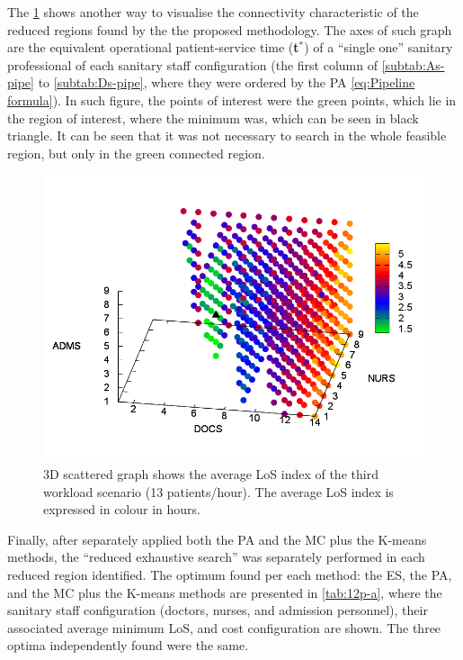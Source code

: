 The \ref{fig:3D-scattered-graph-75} shows another way to visualise
the connectivity characteristic of the reduced regions found by the
the proposed methodology. The axes of such graph are the equivalent
operational patient-service time ({\bf t$^*$})
of a ``single one'' sanitary professional of each sanitary staff
configuration (the first column of \ref{subtab:As-pipe} to \ref{subtab:Ds-pipe},
where they were ordered by the PA \ref{eq:Pipeline formula}). In
such figure, the points of interest were the green points, which lie
in the region of interest, where the minimum was, which can be seen
in black triangle. It can be seen that it was not necessary to search
in the whole feasible region, but only in the green connected region.
\begin{figure}[h]
\noindent \centering{}\includegraphics[width=0.88\columnwidth,height=0.2\paperheight]{figs4/v0/6400-602-75-3D-scatter-LoS2}\caption{3D scattered graph shows the average LoS index of the third workload
scenario (13 patients/hour). The average LoS index is expressed in
colour in hours. \label{fig:3D-scattered-graph-75}}
\end{figure}


Finally, after separately applied both the PA and the MC plus the
K-means methods, the \textquotedblleft{}reduced exhaustive search\textquotedblright{}
was separately performed in each reduced region identified. The optimum
found per each method: the ES, the PA, and the MC plus the K-means
methods are presented in \ref{tab:12p-a}, where the sanitary staff
configuration (doctors, nurses, and admission personnel), their associated
average minimum LoS, and cost configuration are shown. The three optima
independently found were the same. 

